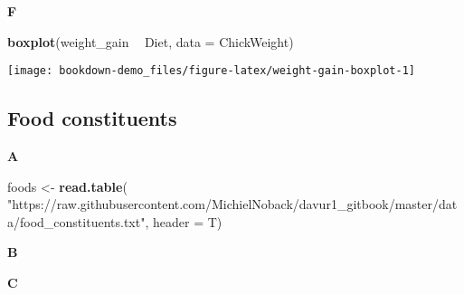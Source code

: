 \documentclass[]{book}
\newenvironment{Shaded}{\begin{snugshade}}{\end{snugshade}}
\newcommand{\CommentTok}[1]{\textcolor[rgb]{0.56,0.35,0.01}{\textit{#1}}}
\newcommand{\DataTypeTok}[1]{\textcolor[rgb]{0.13,0.29,0.53}{#1}}
\newcommand{\DecValTok}[1]{\textcolor[rgb]{0.00,0.00,0.81}{#1}}
\newcommand{\KeywordTok}[1]{\textcolor[rgb]{0.13,0.29,0.53}{\textbf{#1}}}
\newcommand{\NormalTok}[1]{#1}
\newcommand{\OperatorTok}[1]{\textcolor[rgb]{0.81,0.36,0.00}{\textbf{#1}}}
\newcommand{\StringTok}[1]{\textcolor[rgb]{0.31,0.60,0.02}{#1}}
\begin{document}
\textbf{F}

\begin{Shaded}
\begin{Highlighting}[]
\KeywordTok{boxplot}\NormalTok{(weight_gain }\OperatorTok{~}\StringTok{ }\NormalTok{Diet, }\DataTypeTok{data =}\NormalTok{ ChickWeight)}
\end{Highlighting}
\end{Shaded}

\begin{center}\texttt{[image: bookdown-demo\_files/figure-latex/weight-gain-boxplot-1]} \end{center}

\hypertarget{food-constituents-1}{%
\subsection{Food constituents}\label{food-constituents-1}}

\textbf{A}

\begin{Shaded}
\begin{Highlighting}[]
\NormalTok{foods <-}\StringTok{ }\KeywordTok{read.table}\NormalTok{(}
        \StringTok{"https://raw.githubusercontent.com/MichielNoback/davur1_gitbook/master/data/food_constituents.txt"}\NormalTok{, }\DataTypeTok{header =}\NormalTok{ T)}
\end{Highlighting}
\end{Shaded}

\begin{Shaded}
\end{Shaded}

\textbf{B}

\begin{Shaded}
\end{Shaded}

\textbf{C}

\begin{Shaded}
\end{Shaded}
\end{document}

